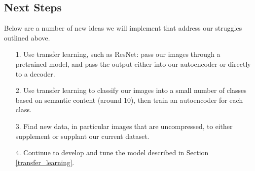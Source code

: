 \documentclass{article} %
\begin{document}
\subsection{Next Steps}
\label{next_steps}

Below are a number of new ideas we will implement that address our struggles outlined above.

\begin{itemize}
    \item[1.] Use transfer learning, such as ResNet: pass our images through a pretrained model, and pass the output either into our autoencoder or directly to a decoder.
    \item[2.] Use transfer learning to classify our images into a small number of classes based on semantic content (around 10), then train an autoencoder for each class.
    \item[3.] Find new data, in particular images that are uncompressed, to either supplement or supplant our current dataset.
    \item[4.] Continue to develop and tune the model described in Section \ref{transfer_learning}.
\end{itemize}

\label{last_page}



\end{document}
